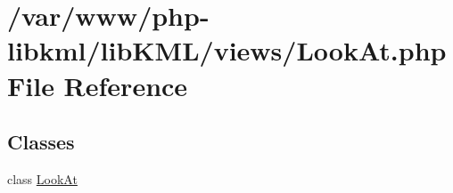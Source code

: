 \hypertarget{LookAt_8php}{
\section{/var/www/php-\/libkml/libKML/views/LookAt.php File Reference}
\label{df/d76/LookAt_8php}
}
\subsection*{Classes}
\begin{DoxyCompactItemize}
\item 
class \hyperlink{classLookAt}{LookAt}
\end{DoxyCompactItemize}
